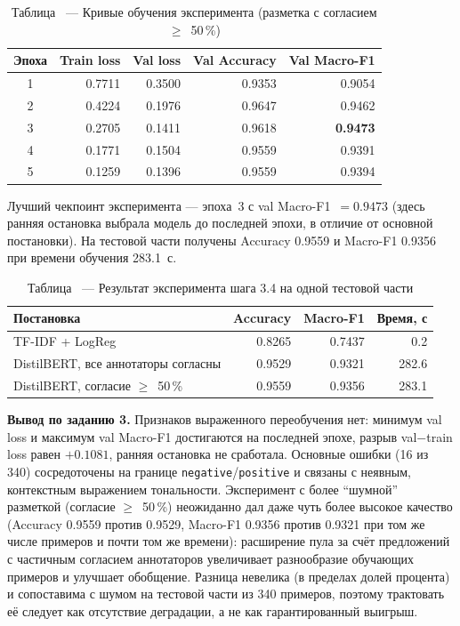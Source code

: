 \documentclass[14pt,a4paper]{extarticle}
\begin{document}
\begin{table}[H]
    \centering
    \caption*{\raggedleft Таблица \thetable\ --- Кривые обучения эксперимента (разметка с согласием $\ge$~50\,\%)}
    \label{tab:exp}
    \begin{tabular}{crrrr}
        \toprule
        Эпоха & Train loss & Val loss & Val Accuracy & Val Macro-F1 \\
        \midrule
        1 & 0.7711 & 0.3500 & 0.9353 & 0.9054 \\
        2 & 0.4224 & 0.1976 & 0.9647 & 0.9462 \\
        3 & 0.2705 & 0.1411 & 0.9618 & \textbf{0.9473} \\
        4 & 0.1771 & 0.1504 & 0.9559 & 0.9391 \\
        5 & 0.1259 & 0.1396 & 0.9559 & 0.9394 \\
        \bottomrule
    \end{tabular}
\end{table}

Лучший чекпоинт эксперимента --- эпоха~3 с val Macro-F1~$=0.9473$ (здесь ранняя
остановка выбрала модель до последней эпохи, в отличие от основной постановки). На
тестовой части получены Accuracy 0.9559 и Macro-F1 0.9356 при времени обучения
283.1~с.

\begin{table}[H]
    \centering
    \caption*{\raggedleft Таблица \thetable\ --- Результат эксперимента шага 3.4 на одной тестовой части}
    \label{tab:final}
    \begin{tabular}{lrrr}
        \toprule
        Постановка & Accuracy & Macro-F1 & Время, с \\
        \midrule
        TF-IDF + LogReg                        & 0.8265 & 0.7437 & 0.2 \\
        DistilBERT, все аннотаторы согласны   & 0.9529 & 0.9321 & 282.6 \\
        DistilBERT, согласие $\ge$~50\,\%   & 0.9559 & 0.9356 & 283.1 \\
        \bottomrule
    \end{tabular}
\end{table}

\noindent\textbf{Вывод по заданию 3.} Признаков выраженного переобучения нет:
минимум val loss и максимум val Macro-F1 достигаются на последней эпохе, разрыв
val$-$train loss равен $+0.1081$, ранняя остановка не сработала. Основные ошибки
(16 из 340) сосредоточены на границе \texttt{negative}/\texttt{positive} и связаны
с неявным, контекстным выражением тональности. Эксперимент с более ``шумной''
разметкой (согласие $\ge$~50\,\%) неожиданно дал даже чуть более высокое качество
(Accuracy 0.9559 против 0.9529, Macro-F1 0.9356 против 0.9321 при том же
числе примеров и почти том же времени): расширение пула за счёт предложений с
частичным согласием аннотаторов увеличивает разнообразие обучающих примеров и
улучшает обобщение. Разница невелика (в пределах долей процента) и сопоставима с
шумом на тестовой части из 340 примеров, поэтому трактовать её следует как
отсутствие деградации, а не как гарантированный выигрыш.
\end{document}
